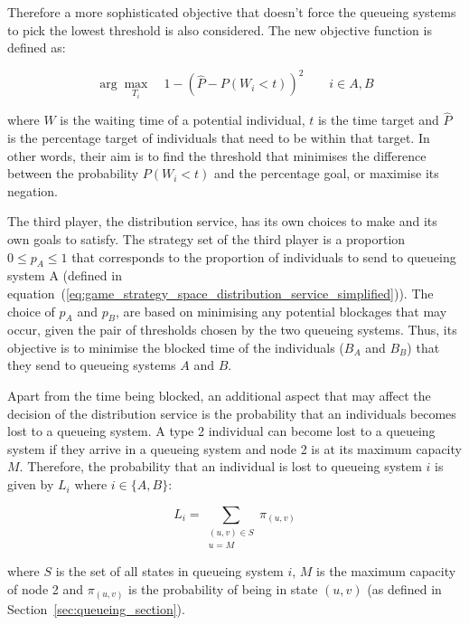 Therefore a more sophisticated objective that doesn't force the queueing systems
to pick the lowest threshold is also considered.
The new objective function is defined as:

\begin{equation}\label{eq:obj_queueing_systems}
    \arg \max_{T_i} \quad 1 - \left( \hat{P} - P(W_i < t) \right)^2
    \qquad i \in {A, B}
\end{equation}

where \(W\) is the waiting time of a potential individual, \(t\) is the time
target and \(\hat{P}\) is the percentage target of individuals that need to be
within that target.
In other words, their aim is to find the threshold that minimises the
difference between the probability \(P(W_i < t)\) and the percentage goal,
or maximise its negation.

The third player, the distribution service, has its own choices to make and
its own goals to satisfy.
The strategy set of the third player is a proportion \(0 \leq p_A \leq 1\)
that corresponds to the proportion of individuals to send to queueing system A
(defined in
equation~(\ref{eq:game_strategy_space_distribution_service_simplified})).
The choice of \(p_A\) and \(p_B\), are based on minimising any potential
blockages that may occur, given the pair of thresholds chosen by the two
queueing systems.
Thus, its objective is to minimise the blocked time of the individuals
(\(B_A\) and \(B_B\)) that they send to queueing systems \(A\) and \(B\).

Apart from the time being blocked, an additional aspect that may affect the
decision of the distribution service is the probability that an individuals
becomes lost to a queueing system.
A type 2 individual can become lost to a queueing system if they arrive in a
queueing system and node 2 is at its maximum capacity \(M\).
Therefore, the probability that an individual is lost to queueing system \(i\)
is given by \(L_i\) where \(i \in \{A, B\}\):

\begin{equation}\label{eq:probability_lost}
    L_i = \sum_{\substack{(u, v) \in S \\ u = M}} \pi_{(u, v)}
\end{equation}

where \(S\) is the set of all states in queueing system \(i\), \(M\) is the
maximum capacity of node 2 and \(\pi_{(u, v)}\) is the probability of being in
state \((u, v)\) (as defined in Section~\ref{sec:queueing_section}).

